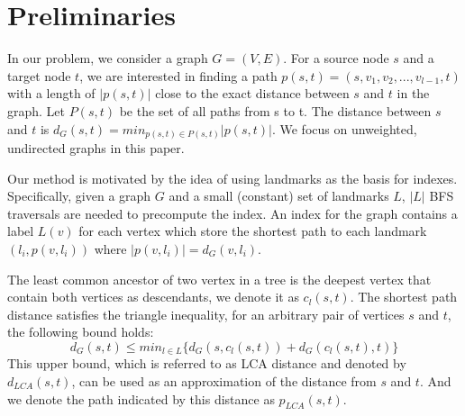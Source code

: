 \section{Preliminaries}
\label{preliminary}

In our problem, we consider a graph $G = (V,E)$. For a source node $s$ and a target node $t$, we are interested in finding a path $p(s,t)=(s,v_1,v_2,...,v_{l-1},t)$ with a length of $|p(s,t)|$ close to the exact distance between $s$ and $t$ in the graph. Let $P(s,t)$ be the set of all paths from s to t. The distance between $s$ and $t$ is $d_G(s,t) = min_{p(s,t) \in P(s,t)}|p(s,t)|$. We focus on unweighted, undirected graphs in this paper.


Our method is motivated by the idea of using landmarks as the basis for indexes. Specifically, given a graph $G$ and a small (constant) set of landmarks $L$, $|L|$ BFS traversals are needed to precompute the index. An index for the graph contains a label $L(v)$ for each vertex which store the shortest path to each landmark $(l_i, p(v,l_i))$ where $|p(v,l_i)| = d_G(v,l_i)$.


The least common ancestor of two vertex in a tree is the deepest vertex that contain both vertices as descendants, we denote it as $c_l(s,t)$. The shortest path distance satisfies the triangle inequality, for an arbitrary pair of vertices $s$ and $t$, the following bound holds:
\begin{equation}
    d_G(s,t) \leq min_{l \in L}\{d_G(s,c_l(s,t)) + d_G(c_l(s,t),t)\}
\end{equation}
This upper bound, which is referred to as LCA distance and denoted by $d_{LCA}(s,t)$, can be used as an approximation of the distance from $s$ and $t$. And we denote the path indicated by this distance as $p_{LCA}(s,t)$.